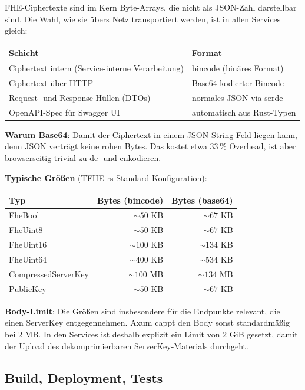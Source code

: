 FHE-Ciphertexte sind im Kern Byte-Arrays, die nicht als JSON-Zahl darstellbar sind. Die Wahl, wie sie übers Netz transportiert werden, ist in allen Services gleich:

\begin{tabular}{||l|p{6cm}||}
    \hline
    \textbf{Schicht} & \textbf{Format} \\
    \hline\hline
    Ciphertext intern (Service-interne Verarbeitung) & bincode (binäres Format) \\
    \hline
    Ciphertext über HTTP & Base64-kodierter Bincode \\
    \hline
    Request- und Response-Hüllen (DTOs) & normales JSON via serde \\
    \hline
    OpenAPI-Spec für Swagger UI & automatisch aus Rust-Typen \\
    \hline
\end{tabular}

\textbf{Warum Base64}:
Damit der Ciphertext in einem JSON-String-Feld liegen kann, denn JSON verträgt keine rohen Bytes. Das kostet etwa 33\,\% Overhead, ist aber browserseitig trivial zu de- und enkodieren.

\textbf{Typische Größen} (TFHE-rs Standard-Konfiguration):

\begin{tabular}{||l|r|r||}
    \hline
    \textbf{Typ} & \textbf{Bytes (bincode)} & \textbf{Bytes (base64)} \\
    \hline\hline
    FheBool & \(\sim 50\) KB & \(\sim 67\) KB \\
    \hline
    FheUint8 & \(\sim 50\) KB & \(\sim 67\) KB \\
    \hline
    FheUint16 & \(\sim 100\) KB & \(\sim 134\) KB \\
    \hline
    FheUint64 & \(\sim 400\) KB & \(\sim 534\) KB \\
    \hline
    CompressedServerKey & \(\sim 100\) MB & \(\sim 134\) MB \\
    \hline
    PublicKey & \(\sim 50\) KB & \(\sim 67\) KB \\
    \hline
\end{tabular}

\textbf{Body-Limit}:
Die Größen sind insbesondere für die Endpunkte relevant, die einen ServerKey entgegennehmen. Axum cappt den Body sonst standardmäßig bei 2 MB. In den Services ist deshalb explizit ein Limit von 2 GiB gesetzt, damit der Upload des dekomprimierbaren ServerKey-Materials durchgeht.

\subsection{Build, Deployment, Tests}
\label{sub:build_deployment_tests}

